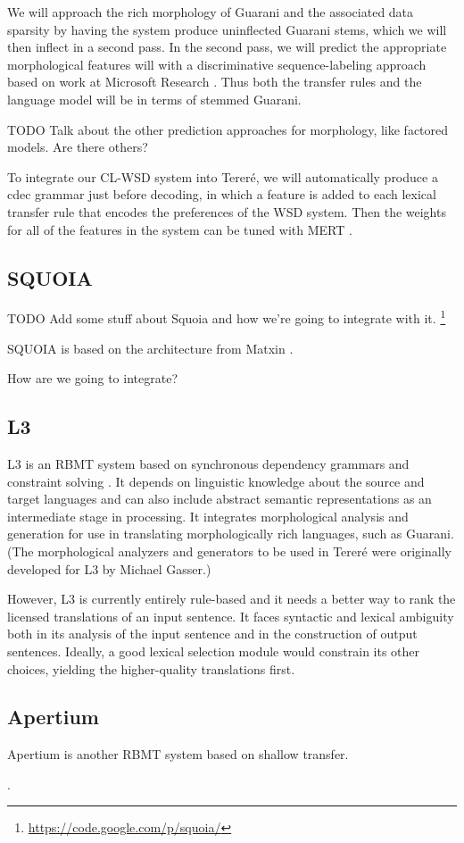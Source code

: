 We will approach the rich morphology of Guarani and the associated data
sparsity by having the system produce uninflected Guarani stems,
which we will then inflect in a second pass.
In the second pass, we will predict the appropriate morphological features will
with a discriminative sequence-labeling approach based on work at Microsoft
Research \cite{toutanova-suzuki-ruopp:2008:ACLMain}.
Thus both the transfer rules and the language model will be in terms of stemmed
Guarani.

TODO Talk about the other prediction approaches for morphology, like factored
models. Are there others?

To integrate our CL-WSD system into Tereré, we will automatically produce a
cdec grammar just before decoding, in which a feature is added to each lexical
transfer rule that encodes the preferences of the WSD system.
Then the weights for all of the features in the system can be tuned with MERT
\cite{och:2003:ACL}.

\subsection{SQUOIA}
TODO Add some stuff about Squoia and how we're going to integrate with it.
\cite{riosgonzales-gohring:2013:HyTra}
\footnote{\url{https://code.google.com/p/squoia/}}


SQUOIA is based on the architecture from Matxin \cite{matxin_2005}. 

How are we going to integrate?

\subsection{L3}

\cite{gasser:sxdg}

L3 is an RBMT system based on synchronous dependency grammars and constraint
solving \cite{gasser:sxdg,gasser:aflat2012}.
It depends on linguistic knowledge about the source and target languages and
can also include abstract semantic representations as an intermediate stage in
processing. It integrates morphological analysis and generation for use in
translating morphologically rich languages, such as Guarani.
(The morphological analyzers and generators to be used in Tereré were
originally developed for L3 by Michael Gasser.)

However, L3 is currently entirely rule-based and it needs a better way to rank
the licensed translations of an input sentence. It faces syntactic and lexical
ambiguity both in its analysis of the input sentence and in the construction of
output sentences. Ideally, a good lexical selection module would constrain its
other choices, yielding the higher-quality translations first.

\subsection{Apertium}
Apertium is another RBMT system based on shallow transfer.

\cite{Forcada_theapertium}.

